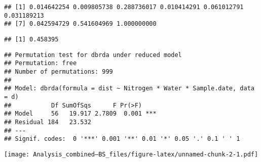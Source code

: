 \documentclass[
]{article}
\begin{document}
\begin{verbatim}
## [1] 0.014642254 0.009805738 0.288736017 0.010414291 0.061012791 0.031189213
## [7] 0.042594729 0.541604969 1.000000000
\end{verbatim}

\begin{verbatim}
## [1] 0.458395
\end{verbatim}

\begin{verbatim}
## Permutation test for dbrda under reduced model
## Permutation: free
## Number of permutations: 999
## 
## Model: dbrda(formula = dist ~ Nitrogen * Water * Sample.date, data = d)
##           Df SumOfSqs      F Pr(>F)    
## Model     56   19.917 2.7809  0.001 ***
## Residual 184   23.532                  
## ---
## Signif. codes:  0 '***' 0.001 '**' 0.01 '*' 0.05 '.' 0.1 ' ' 1
\end{verbatim}

\texttt{[image: Analysis\_combined---BS\_files/figure-latex/unnamed-chunk-2-1.pdf]}
\end{document}
